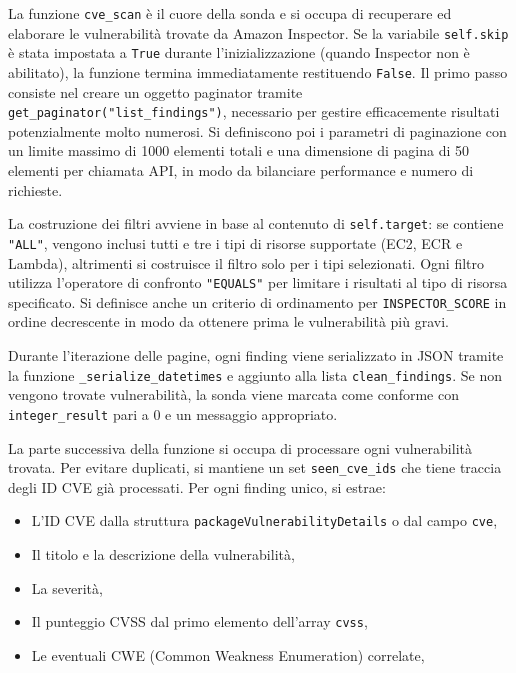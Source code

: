 La funzione \texttt{cve\_scan} è il cuore della sonda e si occupa di recuperare ed elaborare le vulnerabilità trovate da Amazon Inspector. Se la variabile \texttt{self.skip} è stata impostata a \texttt{True} durante l'inizializzazione (quando Inspector non è abilitato), la funzione termina immediatamente restituendo \texttt{False}. Il primo passo consiste nel creare un oggetto paginator tramite \texttt{get\_paginator("list\_findings")}, necessario per gestire efficacemente risultati potenzialmente molto numerosi. Si definiscono poi i parametri di paginazione con un limite massimo di 1000 elementi totali e una dimensione di pagina di 50 elementi per chiamata API, in modo da bilanciare performance e numero di richieste.

La costruzione dei filtri avviene in base al contenuto di \texttt{self.target}: se contiene \texttt{"ALL"}, vengono inclusi tutti e tre i tipi di risorse supportate (EC2, ECR e Lambda), altrimenti si costruisce il filtro solo per i tipi selezionati. Ogni filtro utilizza l'operatore di confronto \texttt{"EQUALS"} per limitare i risultati al tipo di risorsa specificato. Si definisce anche un criterio di ordinamento per \texttt{INSPECTOR\_SCORE} in ordine decrescente in modo da ottenere prima le vulnerabilità più gravi.

Durante l'iterazione delle pagine, ogni finding viene serializzato in JSON tramite la funzione \texttt{\_serialize\_datetimes} e aggiunto alla lista \texttt{clean\_findings}. Se non vengono trovate vulnerabilità, la sonda viene marcata come conforme con \texttt{integer\_result} pari a 0 e un messaggio appropriato.

La parte successiva della funzione si occupa di processare ogni vulnerabilità trovata. Per evitare duplicati, si mantiene un set \texttt{seen\_cve\_ids} che tiene traccia degli ID CVE già processati. Per ogni finding unico, si estrae:
\begin{itemize}
\item L'ID CVE dalla struttura \texttt{packageVulnerabilityDetails} o dal campo \texttt{cve},
\item Il titolo e la descrizione della vulnerabilità,
\item La severità,
\item Il punteggio CVSS dal primo elemento dell'array \texttt{cvss},
\item Le eventuali CWE (Common Weakness Enumeration) correlate,
\end{itemize}

